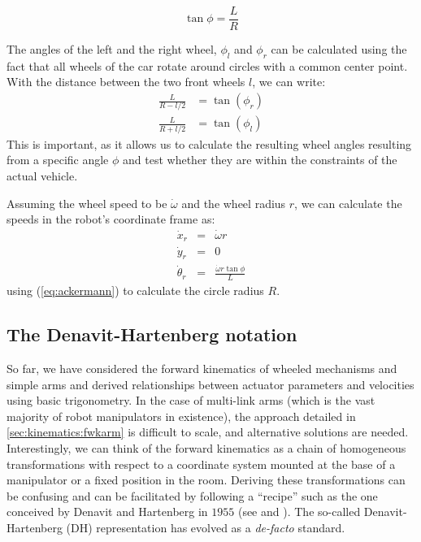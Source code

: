 \begin{equation}\label{eq:ackermann}
\tan \phi = \frac{L}{R}
\end{equation}

The angles of the left and the right wheel, $ \phi_l$ and $ \phi_r$ can be calculated using the fact that all wheels of the car rotate around circles with a common center point. With the distance between the two front wheels $l$, we can write:
\begin{eqnarray}
\frac{L}{R-l/2}&=\tan{(\phi_r)} \nonumber \\
\frac{L}{R+l/2}&=\tan{(\phi_l)}
\end{eqnarray}
This is important, as it allows us to calculate the resulting wheel angles resulting from a specific angle $\phi$ and test whether they are within the constraints of the actual vehicle.

Assuming the wheel speed to be $\dot{\omega}$ and the wheel radius $r$, we can calculate the speeds in the robot's coordinate frame as:
\begin{eqnarray}
\dot{x}_r&=&\dot{\omega}r \nonumber \\
\dot{y}_r&=&0\\
\dot{\theta}_r&=&\frac{\dot{\omega}r\tan\phi}{L} \nonumber
\end{eqnarray}
using (\ref{eq:ackermann}) to calculate the circle radius $R$.

\subsection{The Denavit-Hartenberg notation}\label{sec:kinematics:fwk:dh}

So far, we have considered the forward kinematics of wheeled mechanisms and simple arms and derived relationships between actuator parameters and velocities using basic trigonometry.
In the case of multi-link arms (which is the vast majority of robot manipulators in existence), the approach detailed in \cref{sec:kinematics:fwkarm} is difficult to scale, and alternative solutions are needed.
Interestingly, we can think of the forward kinematics as a chain of homogeneous transformations with respect to a coordinate system mounted at the base of a manipulator or a fixed position in the room.
Deriving these transformations can be confusing and can be facilitated by following a ``recipe'' such as the one conceived by Denavit and Hartenberg in $1955$ (see \cite{hartenberg1955kinematic} and \cite{craig2009introduction}).
The so-called Denavit-Hartenberg (DH) representation has evolved as a \textsl{de-facto} standard.

